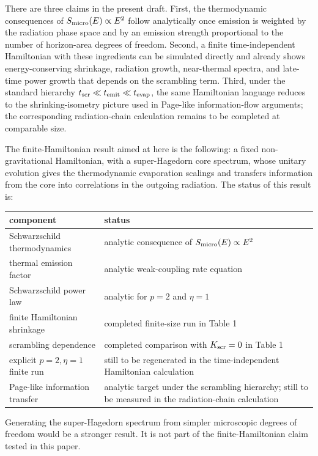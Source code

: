 \documentclass[12pt]{article}
\newcommand{\Smicro}{S_{\rm micro}}
\begin{document}
There are three claims in the present draft.  First, the thermodynamic
consequences of $\Smicro(E)\propto E^2$ follow analytically once emission is
weighted by the radiation phase space and by an emission strength proportional
to the number of horizon-area degrees of freedom.  Second, a finite
time-independent Hamiltonian with these ingredients can
be simulated directly and already shows energy-conserving shrinkage, radiation
growth, near-thermal spectra, and late-time power growth that depends on the
scrambling term.  Third, under the standard hierarchy
$t_{\rm scr}\ll t_{\rm emit}\ll t_{\rm evap}$, the same Hamiltonian language
reduces to the shrinking-isometry picture used in Page-like information-flow
arguments; the corresponding radiation-chain calculation remains to be
completed at comparable size.

The finite-Hamiltonian result aimed at here is the following: a fixed
non-gravitational Hamiltonian, with a super-Hagedorn core spectrum, whose
unitary evolution gives the thermodynamic evaporation scalings and transfers
information from the core into correlations in the outgoing radiation.  The
status of this result is:
\begin{center}
\begin{tabular}{lp{3.8in}}
\toprule
component & status\\
\midrule
Schwarzschild thermodynamics & analytic consequence of
$\Smicro(E)\propto E^2$\\
thermal emission factor & analytic weak-coupling rate equation\\
Schwarzschild power law & analytic for $p=2$ and $\eta=1$\\
finite Hamiltonian shrinkage & completed finite-size run in Table 1\\
scrambling dependence & completed comparison with $K_{\rm scr}=0$ in Table 1\\
explicit $p=2,\eta=1$ finite run & still to be regenerated in the
time-independent Hamiltonian calculation\\
Page-like information transfer & analytic target under the scrambling hierarchy;
still to be measured in the radiation-chain calculation\\
\bottomrule
\end{tabular}
\end{center}
Generating the super-Hagedorn spectrum from simpler microscopic degrees of
freedom would be a stronger result.  It is not part of the finite-Hamiltonian
claim tested in this paper.
\end{document}
